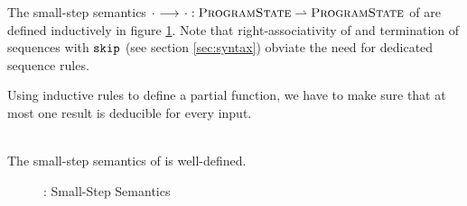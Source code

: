 The small-step semantics ${\cdot} \,\,{\longrightarrow^{}}\,\, {\cdot} : \textup{\textsc{ProgramState}} \rightharpoonup \textup{\textsc{ProgramState}}$ of \svlidf are defined inductively in figure \ref{fig:svl-sem-dyn-sstep}.
Note that right-associativity of \ttt{;} and termination of sequences with $\textup{\texttt{skip}}$ (see section \ref{sec:syntax}) obviate the need for dedicated sequence rules.

Using inductive rules to define a partial function, we have to make sure that at most one result is deducible for every input.
\begin{lemma}
    \label{lemma:ss-wd}~\\
    The small-step semantics of \svlidf is well-defined.
\end{lemma}

\begin{figure}
    \boxed{\sstep{\pi}{\pi}}
    
    \caption{\svlidf: Small-Step Semantics}
    \label{fig:svl-sem-dyn-sstep}
\end{figure}


